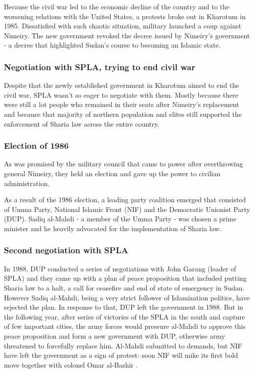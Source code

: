 \documentclass[14pt,a4paper]{article}
\begin{document}
Because the civil war led to the economic decline of the country and to the worsening relations with the United States, a protests broke out in Kharotum in 1985. Dissatisfied with such chaotic situation, military launched a coup against Nimeiry.
The new government revoked the decree issued by Nimeiry's government - a decree that highlighted Sudan's course to becoming an Islamic state. 

\subsubsection{Negotiation with SPLA, trying to end civil war}

Despite that the newly established government in Kharotum aimed to end the civil war, SPLA wasn't so eager to negotiate with them. Mostly because there were still a lot people who remained in their seats after Nimeiry's replacement and because that majority of northern population and elites still supported the enforcement of Sharia law across the entire country.

\subsubsection{Election of 1986}

As was promised by the military council that came to power after overthrowing general Nimeiry, they held an election and gave up the power to civilian administration. 

As a result of the 1986 election, a leading party coalition emerged that consisted of Umma Party, National Islamic Front (NIF) and the Democratic Unionist Party (DUP). Sadiq al-Mahdi - a member of the Umma Party - was chosen a prime minister and he heavily advocated for the implementation of Sharia law.

\subsubsection{Second negotiation with SPLA}

In 1988, DUP conducted a series of negotiations with John Garang (leader of SPLA) and they came up with a plan of peace proposition that included putting Sharia law to a halt, a call for ceasefire and end of state of emergency in Sudan. However Sadiq al-Mahdi, being a very strict follower of Islamization politics, have rejected the plan. In response to that, DUP left the government in 1988. But in the following year, after series of victories of the SPLA in the south and capture of few important cities, the army forces would pressure al-Mahdi to approve this peace proposition and form a new government with DUP, otherwise army threatened to forcefully replace him. Al-Mahdi submitted to demands, but NIF have left the government as a sign of protest: soon NIF will mike its first bold move together with colonel Omar al-Bashir \cite{johnson2003root}. 
\end{document}
